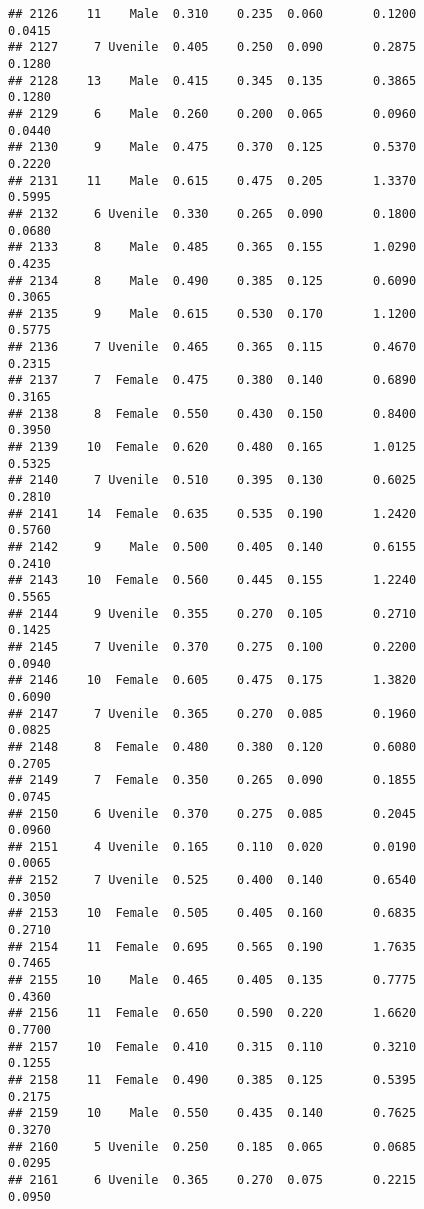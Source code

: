 \documentclass[
]{article}
\begin{document}
\begin{verbatim}
## 2126    11    Male  0.310    0.235  0.060       0.1200         0.0415
## 2127     7 Uvenile  0.405    0.250  0.090       0.2875         0.1280
## 2128    13    Male  0.415    0.345  0.135       0.3865         0.1280
## 2129     6    Male  0.260    0.200  0.065       0.0960         0.0440
## 2130     9    Male  0.475    0.370  0.125       0.5370         0.2220
## 2131    11    Male  0.615    0.475  0.205       1.3370         0.5995
## 2132     6 Uvenile  0.330    0.265  0.090       0.1800         0.0680
## 2133     8    Male  0.485    0.365  0.155       1.0290         0.4235
## 2134     8    Male  0.490    0.385  0.125       0.6090         0.3065
## 2135     9    Male  0.615    0.530  0.170       1.1200         0.5775
## 2136     7 Uvenile  0.465    0.365  0.115       0.4670         0.2315
## 2137     7  Female  0.475    0.380  0.140       0.6890         0.3165
## 2138     8  Female  0.550    0.430  0.150       0.8400         0.3950
## 2139    10  Female  0.620    0.480  0.165       1.0125         0.5325
## 2140     7 Uvenile  0.510    0.395  0.130       0.6025         0.2810
## 2141    14  Female  0.635    0.535  0.190       1.2420         0.5760
## 2142     9    Male  0.500    0.405  0.140       0.6155         0.2410
## 2143    10  Female  0.560    0.445  0.155       1.2240         0.5565
## 2144     9 Uvenile  0.355    0.270  0.105       0.2710         0.1425
## 2145     7 Uvenile  0.370    0.275  0.100       0.2200         0.0940
## 2146    10  Female  0.605    0.475  0.175       1.3820         0.6090
## 2147     7 Uvenile  0.365    0.270  0.085       0.1960         0.0825
## 2148     8  Female  0.480    0.380  0.120       0.6080         0.2705
## 2149     7  Female  0.350    0.265  0.090       0.1855         0.0745
## 2150     6 Uvenile  0.370    0.275  0.085       0.2045         0.0960
## 2151     4 Uvenile  0.165    0.110  0.020       0.0190         0.0065
## 2152     7 Uvenile  0.525    0.400  0.140       0.6540         0.3050
## 2153    10  Female  0.505    0.405  0.160       0.6835         0.2710
## 2154    11  Female  0.695    0.565  0.190       1.7635         0.7465
## 2155    10    Male  0.465    0.405  0.135       0.7775         0.4360
## 2156    11  Female  0.650    0.590  0.220       1.6620         0.7700
## 2157    10  Female  0.410    0.315  0.110       0.3210         0.1255
## 2158    11  Female  0.490    0.385  0.125       0.5395         0.2175
## 2159    10    Male  0.550    0.435  0.140       0.7625         0.3270
## 2160     5 Uvenile  0.250    0.185  0.065       0.0685         0.0295
## 2161     6 Uvenile  0.365    0.270  0.075       0.2215         0.0950

\end{verbatim}
\end{document}
